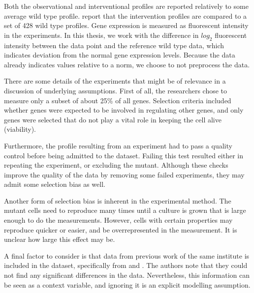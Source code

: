 Both the observational and interventional profiles are reported relatively to some average wild type profile. \citet{kemmeren2014large} report that the intervention profiles are compared to a set of 428 wild type profiles. Gene expression is measured as fluorescent intensity in the experiments. In this thesis, we work with the difference in $log_2$ fluorescent intensity between the data point and the reference wild type data, which indicates deviation from the normal gene expression levels. Because the data already indicates values relative to a norm, we choose to not preprocess the data.


There are some details of the experiments that might be of relevance in a discussion of underlying assumptions. First of all, the researchers chose to measure only a subset of about 25\% of all genes. Selection criteria included whether genes were expected to be involved in regulating other genes, and only genes were selected that do not play a vital role in keeping the cell alive (viability). 

Furthermore, the profile resulting from an experiment had to pass a quality control before being admitted to the dataset. Failing this test resulted either in repeating the experiment, or excluding the mutant. Although these checks improve the quality of the data by removing some failed experiments, they may admit some selection bias as well. 

Another form of selection bias is inherent in the experimental method. The mutant cells need to reproduce many times until a culture is grown that is large enough to do the measurements. However, cells with certain properties may reproduce quicker or easier, and be overrepresented in the measurement. It is unclear how large this effect may be.

A final factor to consider is that  data from previous work of the same institute is included in the dataset, specifically from \citet{lenstra2011specificity} and \citet{van2010functional}. The authors note that they could not find any significant differences in the data. Nevertheless, this information can be seen as a context variable, and ignoring it is an explicit modelling assumption.

